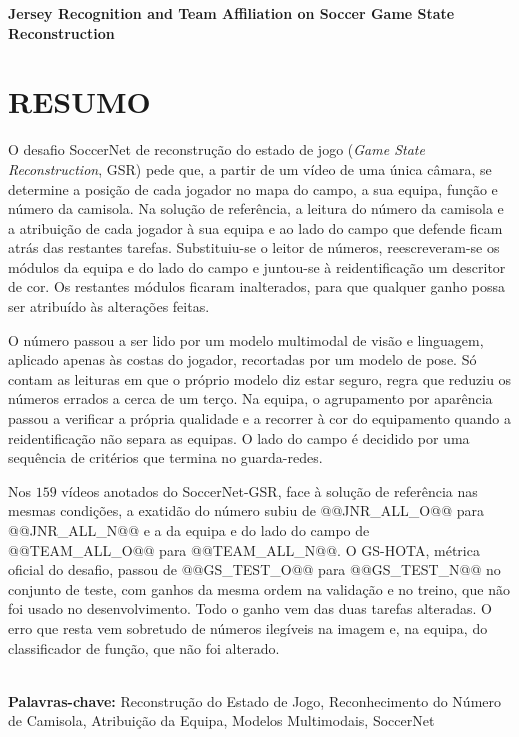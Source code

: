 \begingroup
\begin{flushleft}
\bfseries
{}
{\Large
Jersey Recognition and Team Affiliation on Soccer Game State Reconstruction}

\mdseries
\end{flushleft}
\normalsize
\let\clearpage\relax
\chapter{RESUMO}
\endgroup

\noindent O desafio SoccerNet de reconstrução do estado de jogo (\emph{Game State Reconstruction}, GSR)
pede que, a partir de um vídeo de uma única câmara, se determine a posição de cada jogador no
mapa do campo, a sua equipa, função e número da camisola. Na solução de referência, a leitura do número da camisola e a atribuição de cada jogador à sua
equipa e ao lado do campo que defende ficam atrás das restantes tarefas. Substituiu-se o leitor de
números, reescreveram-se os módulos da equipa e do lado do campo e juntou-se à reidentificação um
descritor de cor. Os restantes módulos ficaram inalterados, para que qualquer ganho
possa ser atribuído às alterações feitas.

O número passou a ser lido por um modelo multimodal de visão e linguagem, aplicado apenas às costas
do jogador, recortadas por um modelo de pose. Só contam as leituras em que o próprio modelo
diz estar seguro, regra que reduziu os números errados a cerca de um terço. Na equipa, o
agrupamento por aparência passou a verificar a própria qualidade e a recorrer à cor do
equipamento quando a reidentificação não separa as equipas. O lado do campo é decidido por uma
sequência de critérios que termina no guarda-redes.

Nos $159$ vídeos anotados do SoccerNet-GSR, face à solução de referência nas mesmas condições,
a exatidão do número subiu de @@JNR_ALL_O@@ para @@JNR_ALL_N@@ e a da equipa e do lado do
campo de @@TEAM_ALL_O@@ para @@TEAM_ALL_N@@. O GS-HOTA, métrica oficial do desafio, passou de
@@GS_TEST_O@@ para @@GS_TEST_N@@ no conjunto de teste, com ganhos da mesma ordem na validação e no
treino, que não foi usado no desenvolvimento. Todo o ganho vem das duas tarefas alteradas. O erro que
resta vem sobretudo de números ilegíveis na imagem e, na equipa, do classificador de função, que não
foi alterado.

\hspace{3cm}\\
\indent
\textbf{Palavras-chave: } Reconstrução do Estado de Jogo, Reconhecimento do Número de Camisola,
Atribuição da Equipa, Modelos Multimodais, SoccerNet
